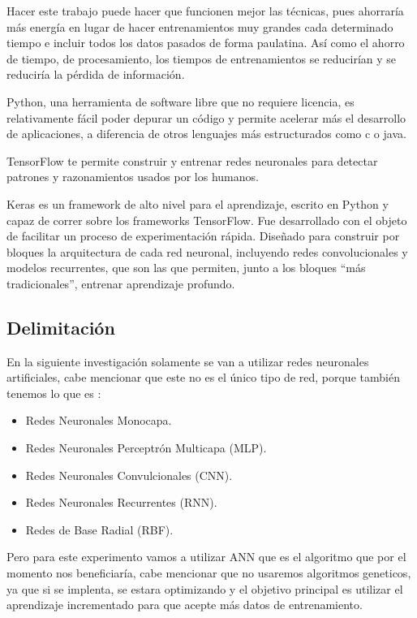 Hacer este trabajo puede hacer que funcionen mejor las técnicas, pues ahorraría más energía en lugar de hacer entrenamientos muy grandes cada determinado tiempo e incluir todos los datos pasados de forma paulatina. Así como el ahorro de tiempo, de procesamiento, los tiempos de entrenamientos se reducirían y se reduciría la pérdida de información.

Python, una herramienta de software libre que no requiere licencia, es relativamente fácil poder depurar un código y permite acelerar más el desarrollo de aplicaciones,  a diferencia de otros lenguajes más estructurados como c o java.

TensorFlow te permite construir y entrenar redes neuronales para detectar patrones y razonamientos usados por los humanos.

Keras es un framework de alto nivel para el aprendizaje, escrito en Python y capaz de correr sobre los frameworks TensorFlow. Fue desarrollado con el objeto de facilitar un proceso de experimentación rápida. Diseñado para construir por bloques la arquitectura de cada red neuronal, incluyendo redes convolucionales y modelos recurrentes, que son las que permiten, junto a los bloques “más tradicionales”, entrenar aprendizaje profundo.


\subsection{Delimitación}
    
    En la siguiente investigación solamente se van a utilizar redes neuronales artificiales, cabe mencionar que este no es el único tipo de red, porque también tenemos lo que es \cite{royo2021}:
    \begin{itemize}
        \item Redes Neuronales Monocapa.
        \item Redes Neuronales Perceptrón Multicapa (MLP).
        \item Redes Neuronales Convulcionales (CNN).
        \item Redes Neuronales Recurrentes (RNN).
        \item Redes de Base Radial (RBF).
    \end{itemize}
    Pero para este experimento vamos a utilizar ANN que es el algoritmo que por el momento nos beneficiaría, cabe mencionar que no usaremos algoritmos geneticos, ya que si se implenta, se estara
    optimizando y el objetivo principal es utilizar el aprendizaje incrementado para que acepte más datos de entrenamiento.

